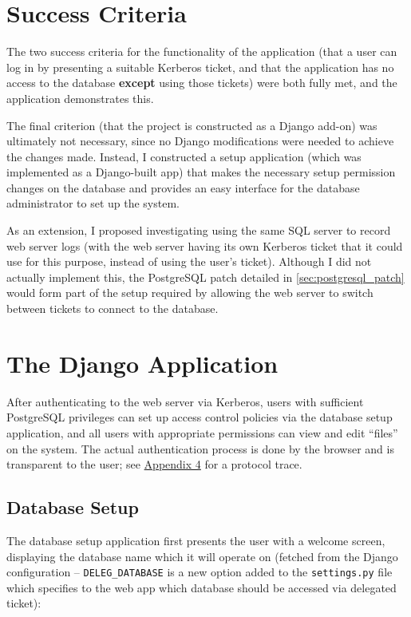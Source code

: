 \documentclass{report}
\begin{document}
\section{Success Criteria}
The two success criteria for the functionality of the application (that a user can log in by presenting a suitable Kerberos ticket, and that the application has no access to the database \textbf{except} using those tickets) were both fully met, and the application demonstrates this.

The final criterion (that the project is constructed as a Django add-on) was ultimately not necessary, since no Django modifications were needed to achieve the changes made. Instead, I constructed a setup application (which was implemented as a Django-built app) that makes the necessary setup permission changes on the database and provides an easy interface for the database administrator to set up the system.

As an extension, I proposed investigating using the same SQL server to record web server logs (with the web server having its own Kerberos ticket that it could use for this purpose, instead of using the user's ticket). Although I did not actually implement this, the PostgreSQL patch detailed in \autoref{sec:postgresql_patch} would form part of the setup required by allowing the web server to switch between tickets to connect to the database.

\section{The Django Application}
After authenticating to the web server via Kerberos, users with sufficient PostgreSQL privileges can set up access control policies via the database setup application, and all users with appropriate permissions can view and edit ``files'' on the system. The actual authentication process is done by the browser and is transparent to the user; see \hyperref[sec:appendix4]{Appendix 4} for a protocol trace.

\subsection{Database Setup}
The database setup application first presents the user with a welcome screen, displaying the database name which it will operate on (fetched from the Django configuration -- \verb+DELEG_DATABASE+ is a new option added to the \verb+settings.py+ file which specifies to the web app which database should be accessed via delegated ticket):
\end{document}
